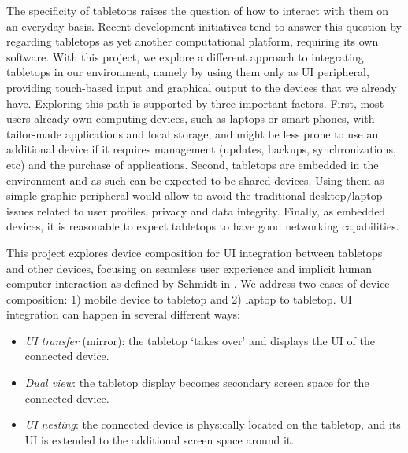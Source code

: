 The specificity of tabletops raises the question of how to interact with them on an everyday basis.
Recent development initiatives tend to answer this question by regarding tabletops as yet another computational platform, requiring its own software.
With this project, we explore a different approach to integrating tabletops in our environment, namely by using them only as UI peripheral, providing touch-based input and graphical output to the devices that we already have.
Exploring this path is supported by three important factors.
First, most users already own computing devices, such as laptops or smart phones, with tailor-made applications and local storage, and might be less prone to use an additional device if it requires management (updates, backups, synchronizations, etc) and the purchase of applications.
Second, tabletops are embedded in the environment and as such can be expected to be shared devices.
Using them as simple graphic peripheral would allow to avoid the traditional desktop/laptop issues related to user profiles, privacy and data integrity.
Finally, as embedded devices, it is reasonable to expect tabletops to have good networking capabilities.

This project explores device composition for UI integration between tabletops and other devices, focusing on seamless user experience and implicit human computer interaction as defined by Schmidt in \cite{implicitHCI}.
We address two cases of device composition: 1) mobile device to tabletop and 2) laptop to tabletop.
UI integration can happen in several different ways:
\begin{itemize}
\item{\emph{UI transfer} (mirror): the tabletop `takes over' and displays the UI of the connected device.}
\item{\emph{Dual view}: the tabletop display becomes secondary screen space for the connected device.}
\item{\emph{UI nesting}: the connected device is physically located on the tabletop, and its UI is extended to the additional screen space around it.}
\end{itemize}

